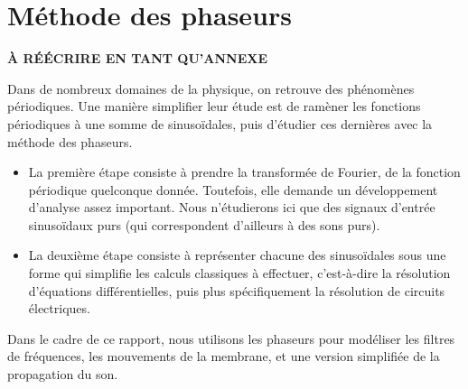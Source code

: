 \chapter{Méthode des phaseurs}
\label{app:phaseurs}

\textbf{À RÉÉCRIRE EN TANT QU'ANNEXE}

Dans de nombreux domaines de la physique,
on retrouve des phénomènes périodiques.
Une manière simplifier leur étude
est de ramèner les fonctions périodiques à une somme de sinusoïdales,
puis d'étudier ces dernières avec la méthode des phaseurs.
\begin{itemize}
    \item La première étape consiste à prendre la transformée de Fourier,
        de la fonction périodique quelconque donnée.
        Toutefois, elle demande un développement d'analyse assez important.
        Nous n'étudierons ici que des signaux d'entrée sinusoïdaux purs
        (qui correspondent d'ailleurs à des sons purs).
    \item La deuxième étape consiste à représenter chacune des sinusoïdales
        sous une forme qui simplifie les calculs classiques à effectuer,
        c'est-à-dire la résolution d'équations différentielles,
        puis plus spécifiquement la résolution de circuits électriques.
\end{itemize}

Dans le cadre de ce rapport,
nous utilisons les phaseurs pour modéliser les filtres de fréquences,
les mouvements de la membrane,
et une version simplifiée de la propagation du son.





